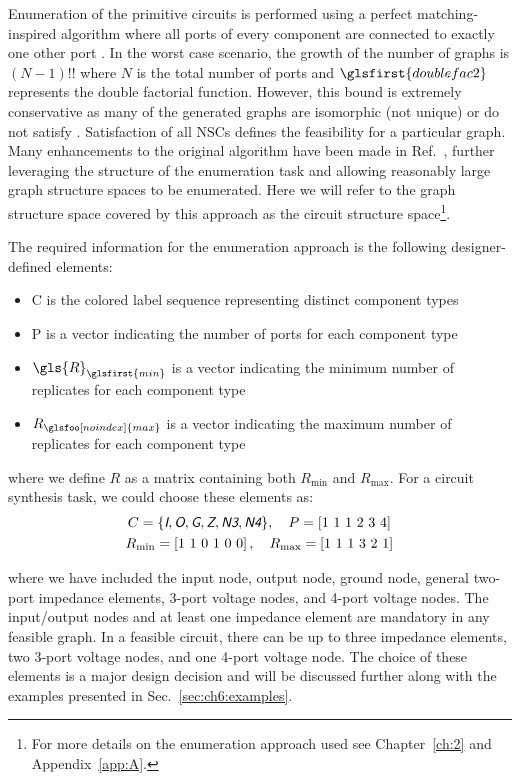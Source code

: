 Enumeration of the primitive circuits is performed using a perfect matching-inspired algorithm where all ports of every component are connected to exactly one other port \cite{Herber2017a}.
In the worst case scenario, the growth of the number of graphs is $(N-1)!!$ where $N$ is the total number of ports and $\glsfirst{doublefac2}$ represents the double factorial function.
However, this bound is extremely conservative as many of the generated graphs are isomorphic (not unique) or do not satisfy .
Satisfaction of all NSCs defines the feasibility for a particular graph. 
Many enhancements to the original algorithm have been made in Ref.~\cite{Herber2017d}, further leveraging the structure of the enumeration task and allowing reasonably large graph structure spaces to be enumerated.
Here we will refer to the graph structure space covered by this approach as the circuit structure space\footnote{For more details on the enumeration approach used see Chapter~\ref{ch:2} and Appendix~\ref{app:A}.}.

The required information for the enumeration approach is the following designer-defined elements:
\begin{itemize}
\item \gls{C} is the colored label sequence representing distinct component types
\item \gls{P} is a vector indicating the number of ports for each component type
\item $\gls{R}_{\glsfirst{min}}$ is a vector indicating the minimum number of replicates for each component type
\item $R_{\glsfoo[noindex]{max}}$ is a vector indicating the maximum number of replicates for each component type
\end{itemize}

\noindent where we define $R$ as a matrix containing both $R_{\min}$ and $R_{\max}$.
For a circuit synthesis task, we could choose these elements as:
% 
\begin{subequations}
\label{eq:ch6:lib1}
\begin{gather}
C = \{ \xcolor{I}, \xcolor{O}, \xcolor{G}, \xcolor{Z}, \xcolor{N3}, \xcolor{N4}  \}, \quad P = \left[ 1\ 1\ 1\ 2\ 3\ 4 \right] \\
R_{\min} = \left[ 1\ 1\ 0\ 1\ 0\ 0 \right], \quad R_{\max} = \left[ 1\ 1\ 1\ 3\ 2\ 1 \right]
\end{gather}
\end{subequations}

\noindent where we have included the input node, output node, ground node, general two-port impedance elements, 3-port voltage nodes, and 4-port voltage nodes.
The input/output nodes and at least one impedance element are mandatory in any feasible graph.
In a feasible circuit, there can be up to three impedance elements, two 3-port voltage nodes, and one 4-port voltage node.
The choice of these elements is a major design decision and will be discussed further along with the examples presented in Sec.~\ref{sec:ch6:examples}.

